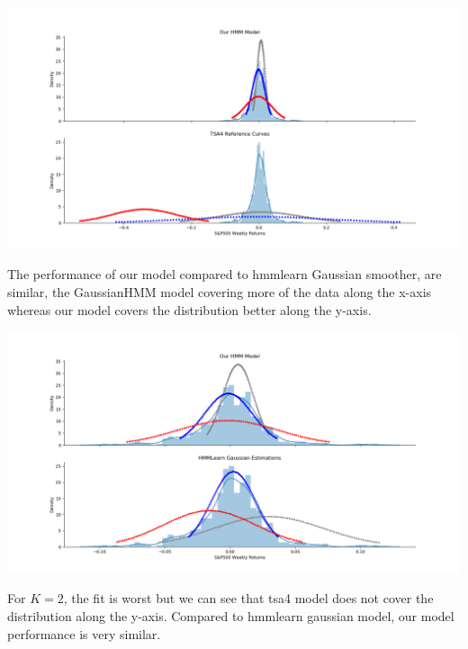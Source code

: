 \documentclass[12pt]{article}
\begin{document}
\begin{center}
	\includegraphics[width=1\linewidth]{figures/problem-3-3.png} 
\end{center}

The performance of our model compared to hmmlearn Gaussian smoother,  are similar, the GaussianHMM model covering more of the data along the x-axis whereas our model covers the
distribution better along the y-axis.
\begin{center}
	\includegraphics[width=1\linewidth]{figures/problem-3-4.png} 
\end{center}

For $K=2$, the fit is worst but we can see that tsa4 model does not cover the distribution along the y-axis. 
Compared to hmmlearn gaussian model, our model performance is very similar.
\end{document}
